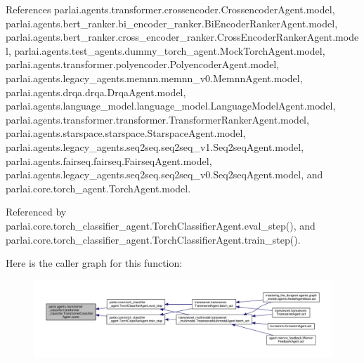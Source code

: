 References parlai.\+agents.\+transformer.\+crossencoder.\+Crossencoder\+Agent.\+model, parlai.\+agents.\+bert\+\_\+ranker.\+bi\+\_\+encoder\+\_\+ranker.\+Bi\+Encoder\+Ranker\+Agent.\+model, parlai.\+agents.\+bert\+\_\+ranker.\+cross\+\_\+encoder\+\_\+ranker.\+Cross\+Encoder\+Ranker\+Agent.\+model, parlai.\+agents.\+test\+\_\+agents.\+dummy\+\_\+torch\+\_\+agent.\+Mock\+Torch\+Agent.\+model, parlai.\+agents.\+transformer.\+polyencoder.\+Polyencoder\+Agent.\+model, parlai.\+agents.\+legacy\+\_\+agents.\+memnn.\+memnn\+\_\+v0.\+Memnn\+Agent.\+model, parlai.\+agents.\+drqa.\+drqa.\+Drqa\+Agent.\+model, parlai.\+agents.\+language\+\_\+model.\+language\+\_\+model.\+Language\+Model\+Agent.\+model, parlai.\+agents.\+transformer.\+transformer.\+Transformer\+Ranker\+Agent.\+model, parlai.\+agents.\+starspace.\+starspace.\+Starspace\+Agent.\+model, parlai.\+agents.\+legacy\+\_\+agents.\+seq2seq.\+seq2seq\+\_\+v1.\+Seq2seq\+Agent.\+model, parlai.\+agents.\+fairseq.\+fairseq.\+Fairseq\+Agent.\+model, parlai.\+agents.\+legacy\+\_\+agents.\+seq2seq.\+seq2seq\+\_\+v0.\+Seq2seq\+Agent.\+model, and parlai.\+core.\+torch\+\_\+agent.\+Torch\+Agent.\+model.



Referenced by parlai.\+core.\+torch\+\_\+classifier\+\_\+agent.\+Torch\+Classifier\+Agent.\+eval\+\_\+step(), and parlai.\+core.\+torch\+\_\+classifier\+\_\+agent.\+Torch\+Classifier\+Agent.\+train\+\_\+step().

Here is the caller graph for this function\+:
\nopagebreak
\begin{figure}[H]
\begin{center}
\leavevmode
\includegraphics[width=350pt]{classparlai_1_1agents_1_1transformer__classifier_1_1transformer__classifier_1_1TransformerClassifierAgent_a8d3cb4862ab598c8f93239255dd65eeb_icgraph}
\end{center}
\end{figure}
\mbox{\label{classparlai_1_1agents_1_1transformer__classifier_1_1transformer__classifier_1_1TransformerClassifierAgent_afff32a6e789532e0bf6223b466e43588}} 
